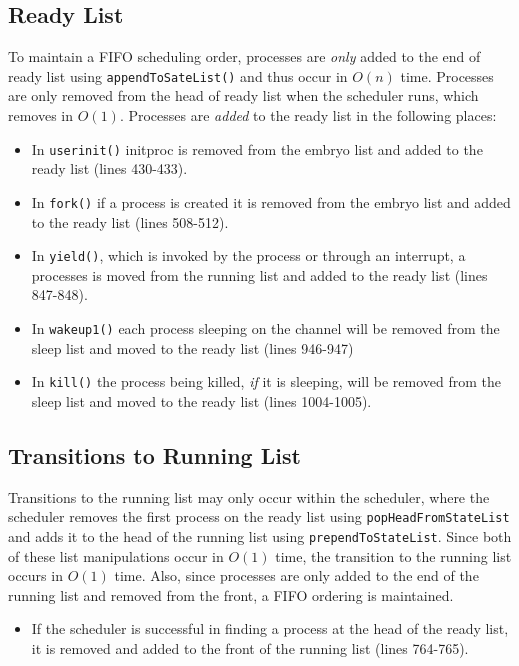 \documentclass[11pt,letterpaper]{report}
\begin{document}
	\subsection*{Ready List}
	To maintain a FIFO scheduling order, processes are \emph{only} added to the end of ready list using {\tt appendToSateList()} and thus occur in $O(n)$ time. Processes are only removed from the head of ready list when the scheduler runs, 
	which removes in $O(1)$. Processes are \emph{added} to the ready list in the following places:
		\begin{itemize}
			\item In {\tt userinit()} initproc is removed from the embryo list and added to the ready list (lines 430-433).
			\item In {\tt fork()} if a process is created it is removed from the embryo list and added to the ready list (lines 508-512).
			\item In {\tt yield()}, which is invoked by the process or through an interrupt, a processes is moved from the running list and added to the ready list (lines 847-848). 
			\item In {\tt wakeup1()} each process sleeping on the channel will be removed from the sleep list and moved to the ready list (lines 946-947)
			\item In {\tt kill()} the process being killed, \emph{if} it is sleeping, will be removed from the sleep list and moved to the ready list (lines 1004-1005).
		\end{itemize}
	

	\subsection*{Transitions to Running List}
	Transitions to the running list may only occur within the scheduler, where the scheduler removes the first process on the ready list using {\tt popHeadFromStateList} and adds it to the head of the running list using {\tt prependToStateList}. Since both
	of these list manipulations occur in $O(1)$ time, the transition to the running list occurs in $O(1)$ time. Also, since processes are only added to the end of the running list and removed from the front, a FIFO ordering is maintained.
		\begin{itemize}
			\item If the scheduler is successful in finding a process at the head of the ready list, it is removed and added to the front of the running list (lines 764-765).
		\end{itemize}
\end{document}
